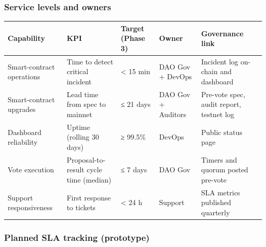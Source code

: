 \documentclass[
  english,
  12pt,
  oneside,
  open=any]{scrbook}
\begin{document}
\subsubsection{Service levels and
owners}\label{service-levels-and-owners}

\begin{longtable}[]{@{}
  >{\raggedright\arraybackslash}p{}
  >{\raggedright\arraybackslash}p{}
  >{\raggedleft\arraybackslash}p{}
  >{\raggedright\arraybackslash}p{}
  >{\raggedright\arraybackslash}p{}@{}}
\toprule\noalign{}
\begin{minipage}[b]{\linewidth}\raggedright
Capability
\end{minipage} & \begin{minipage}[b]{\linewidth}\raggedright
KPI
\end{minipage} & \begin{minipage}[b]{\linewidth}\raggedleft
Target (Phase 3)
\end{minipage} & \begin{minipage}[b]{\linewidth}\raggedright
Owner
\end{minipage} & \begin{minipage}[b]{\linewidth}\raggedright
Governance link
\end{minipage} \\
\midrule\noalign{}
\endhead
\bottomrule\noalign{}
\endlastfoot
Smart-contract operations & Time to detect critical incident &
\textless{} 15 min & DAO Gov + DevOps & Incident log on-chain and
dashboard \\
Smart-contract upgrades & Lead time from spec to mainnet & ≤ 21 days &
DAO Gov + Auditors & Pre-vote spec, audit report, testnet log \\
Dashboard reliability & Uptime (rolling 30 days) & ≥ 99.5\% & DevOps &
Public status page \\
Vote execution & Proposal-to-result cycle time (median) & ≤ 7 days & DAO
Gov & Timers and quorum posted pre-vote \\
Support responsiveness & First response to tickets & \textless{} 24 h &
Support & SLA metrics published quarterly \\
\end{longtable}

\subsubsection{Planned SLA tracking
(prototype)}\label{planned-sla-tracking-prototype}
\end{document}
